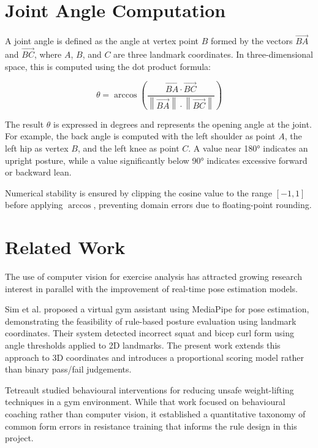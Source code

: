 \section{Joint Angle Computation}
\label{sec:angles}

A joint angle is defined as the angle at vertex point $B$ formed by the vectors $\overrightarrow{BA}$ and $\overrightarrow{BC}$, where $A$, $B$, and $C$ are three landmark coordinates. In three-dimensional space, this is computed using the dot product formula:

\begin{equation}
    \theta = \arccos \left( \frac{\overrightarrow{BA} \cdot \overrightarrow{BC}}{\left\|\overrightarrow{BA}\right\| \cdot \left\|\overrightarrow{BC}\right\|} \right)
    \label{eq:angle3d}
\end{equation}

The result $\theta$ is expressed in degrees and represents the opening angle at the joint. For example, the back angle is computed with the left shoulder as point $A$, the left hip as vertex $B$, and the left knee as point $C$. A value near 180° indicates an upright posture, while a value significantly below 90° indicates excessive forward or backward lean.

Numerical stability is ensured by clipping the cosine value to the range $[-1, 1]$ before applying $\arccos$, preventing domain errors due to floating-point rounding.

\section{Related Work}
\label{sec:related}

The use of computer vision for exercise analysis has attracted growing research interest in parallel with the improvement of real-time pose estimation models.

Sim et al. \cite{Sim2024} proposed a virtual gym assistant using MediaPipe for pose estimation, demonstrating the feasibility of rule-based posture evaluation using landmark coordinates. Their system detected incorrect squat and bicep curl form using angle thresholds applied to 2D landmarks. The present work extends this approach to 3D coordinates and introduces a proportional scoring model rather than binary pass/fail judgements.

Tetreault \cite{Tetreault2016} studied behavioural interventions for reducing unsafe weight-lifting techniques in a gym environment. While that work focused on behavioural coaching rather than computer vision, it established a quantitative taxonomy of common form errors in resistance training that informs the rule design in this project.

